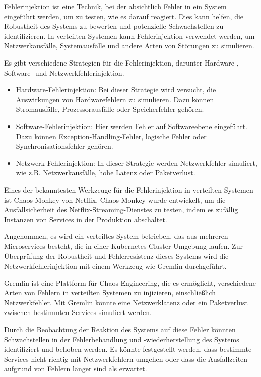 Fehlerinjektion ist eine Technik, bei der absichtlich Fehler in ein System eingeführt werden, um zu testen, wie es darauf reagiert. Dies kann helfen, die Robustheit des Systems zu bewerten und potenzielle Schwachstellen zu identifizieren. In verteilten Systemen kann Fehlerinjektion verwendet werden, um Netzwerkausfälle, Systemausfälle und andere Arten von Störungen zu simulieren.

Es gibt verschiedene Strategien für die Fehlerinjektion, darunter Hardware-, Software- und Netzwerkfehlerinjektion.
\begin{itemize}
\item Hardware-Fehlerinjektion: Bei dieser Strategie wird versucht, die Auswirkungen von Hardwarefehlern zu simulieren. Dazu können Stromausfälle, Prozessorausfälle oder Speicherfehler gehören.
\item Software-Fehlerinjektion: Hier werden Fehler auf Softwareebene eingeführt. Dazu können Exception-Handling-Fehler, logische Fehler oder Synchronisationsfehler gehören.
\item Netzwerk-Fehlerinjektion: In dieser Strategie werden Netzwerkfehler simuliert, wie z.B. Netzwerkausfälle, hohe Latenz oder Paketverlust.
\end{itemize}
Eines der bekanntesten Werkzeuge für die Fehlerinjektion in verteilten Systemen ist Chaos Monkey von Netflix. Chaos Monkey wurde entwickelt, um die Ausfallsicherheit des Netflix-Streaming-Dienstes zu testen, indem es zufällig Instanzen von Services in der Produktion abschaltet.

Angenommen, es wird ein verteiltes System betrieben, das aus mehreren Microservices besteht, die in einer Kubernetes-Cluster-Umgebung laufen. Zur Überprüfung der Robustheit und Fehlerresistenz dieses Systems wird die Netzwerkfehlerinjektion mit einem Werkzeug wie Gremlin durchgeführt.

Gremlin ist eine Plattform für Chaos Engineering, die es ermöglicht, verschiedene Arten von Fehlern in verteilten Systemen zu injizieren, einschließlich Netzwerkfehler. Mit Gremlin könnte eine Netzwerklatenz oder ein Paketverlust zwischen bestimmten Services simuliert werden.

Durch die Beobachtung der Reaktion des Systems auf diese Fehler könnten Schwachstellen in der Fehlerbehandlung und -wiederherstellung des Systems identifiziert und behoben werden. Es könnte festgestellt werden, dass bestimmte Services nicht richtig mit Netzwerkfehlern umgehen oder dass die Ausfallzeiten aufgrund von Fehlern länger sind als erwartet.

